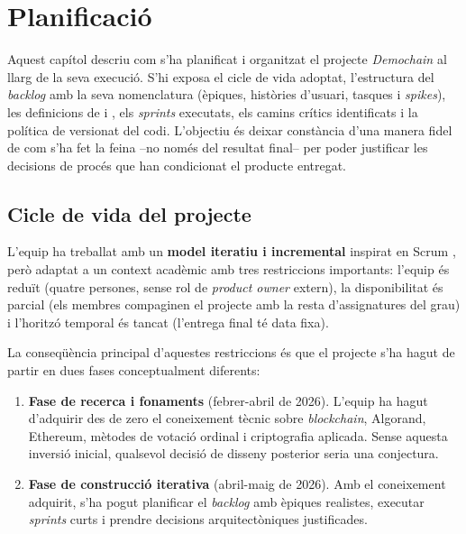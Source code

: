 
\chapter{Planificació}
\label{cap:planificacio}

Aquest capítol descriu com s'ha planificat i organitzat el projecte
\emph{Demochain} al llarg de la seva execució. S'hi exposa el cicle de vida
adoptat, l'estructura del \emph{backlog} amb la seva nomenclatura (èpiques,
històries d'usuari, tasques i \emph{spikes}), les definicions de 
i , els \emph{sprints} executats, els camins crítics identificats i
la política de versionat del codi. L'objectiu és deixar constància d'una
manera fidel de com s'ha fet la feina --no només del resultat final-- per
poder justificar les decisions de procés que han condicionat el producte
entregat.

\section{Cicle de vida del projecte}
\label{sec:cicle-vida}

L'equip ha treballat amb un \textbf{model iteratiu i incremental} inspirat en
Scrum \cite{schwaber2020scrum}, però adaptat a un context acadèmic amb tres
restriccions importants: l'equip és reduït (quatre persones, sense rol de
\emph{product owner} extern), la disponibilitat és parcial (els membres
compaginen el projecte amb la resta d'assignatures del grau) i l'horitzó
temporal és tancat (l'entrega final té data fixa).

La conseqüència principal d'aquestes restriccions és que el projecte s'ha
hagut de partir en dues fases conceptualment diferents:

\begin{enumerate}
    \item \textbf{Fase de recerca i fonaments} (febrer-abril de 2026).
    L'equip ha hagut d'adquirir des de zero el coneixement tècnic sobre
    \emph{blockchain}, Algorand, Ethereum, mètodes de votació ordinal i
    criptografia aplicada. Sense aquesta inversió inicial, qualsevol decisió
    de disseny posterior seria una conjectura.

    \item \textbf{Fase de construcció iterativa} (abril-maig de 2026). Amb
    el coneixement adquirit, s'ha pogut planificar el \emph{backlog} amb
    èpiques realistes, executar \emph{sprints} curts i prendre decisions
    arquitectòniques justificades.
\end{enumerate}

